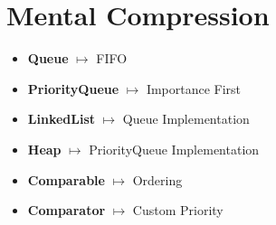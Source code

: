 \documentclass[11pt,a4paper]{book}
\begin{document}
\section{Mental Compression}
\begin{itemize}
\item [ ]\textbf{\textcolor{RosettaBlue}{Queue}}
\hspace{1em}
$\longmapsto$
\hspace{1em}
\textcolor{RosettaDeepGreen}{FIFO}

\vspace{1.0em}

\item [ ]\textbf{\textcolor{RosettaBlue}{PriorityQueue}}
\hspace{1em}
$\longmapsto$
\hspace{1em}
\textcolor{RosettaDeepGreen}{Importance First}

\vspace{1.0em}

\item [ ]\textbf{\textcolor{RosettaBlue}{LinkedList}}
\hspace{1em}
$\longmapsto$
\hspace{1em}
\textcolor{RosettaDeepGreen}{Queue Implementation}

\vspace{1.0em}

\item [ ]\textbf{\textcolor{RosettaBlue}{Heap}}
\hspace{1em}
$\longmapsto$
\hspace{1em}
\textcolor{RosettaDeepGreen}{PriorityQueue Implementation}

\vspace{1.0em}

\item [ ]\textbf{\textcolor{RosettaBlue}{Comparable}}
\hspace{1em}
$\longmapsto$
\hspace{1em}
\textcolor{RosettaDeepGreen}{Ordering}

\vspace{1.0em}

\item [ ]\textbf{\textcolor{RosettaBlue}{Comparator}}
\hspace{1em}
$\longmapsto$
\hspace{1em}
\textcolor{RosettaDeepGreen}{Custom Priority}
\end{itemize}

\end{document}
